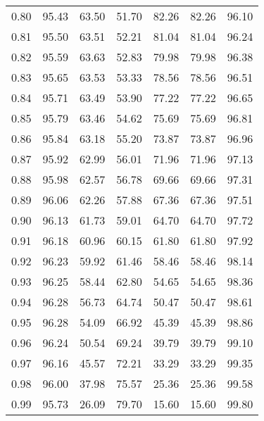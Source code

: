 \begin{tabular}{|c|c|c|c|c|c|c|}
      0.80 &     95.43 &     63.50 &      51.70 &   82.26 &      82.26 &         96.10 \\
      0.81 &     95.50 &     63.51 &      52.21 &   81.04 &      81.04 &         96.24 \\
      0.82 &     95.59 &     63.63 &      52.83 &   79.98 &      79.98 &         96.38 \\
      0.83 &     95.65 &     63.53 &      53.33 &   78.56 &      78.56 &         96.51 \\
      0.84 &     95.71 &     63.49 &      53.90 &   77.22 &      77.22 &         96.65 \\
      0.85 &     95.79 &     63.46 &      54.62 &   75.69 &      75.69 &         96.81 \\
      0.86 &     95.84 &     63.18 &      55.20 &   73.87 &      73.87 &         96.96 \\
      0.87 &     95.92 &     62.99 &      56.01 &   71.96 &      71.96 &         97.13 \\
      0.88 &     95.98 &     62.57 &      56.78 &   69.66 &      69.66 &         97.31 \\
      0.89 &     96.06 &     62.26 &      57.88 &   67.36 &      67.36 &         97.51 \\
      0.90 &     96.13 &     61.73 &      59.01 &   64.70 &      64.70 &         97.72 \\
      0.91 &     96.18 &     60.96 &      60.15 &   61.80 &      61.80 &         97.92 \\
      0.92 &     96.23 &     59.92 &      61.46 &   58.46 &      58.46 &         98.14 \\
      0.93 &     96.25 &     58.44 &      62.80 &   54.65 &      54.65 &         98.36 \\
      0.94 &     96.28 &     56.73 &      64.74 &   50.47 &      50.47 &         98.61 \\
      0.95 &     96.28 &     54.09 &      66.92 &   45.39 &      45.39 &         98.86 \\
      0.96 &     96.24 &     50.54 &      69.24 &   39.79 &      39.79 &         99.10 \\
      0.97 &     96.16 &     45.57 &      72.21 &   33.29 &      33.29 &         99.35 \\
      0.98 &     96.00 &     37.98 &      75.57 &   25.36 &      25.36 &         99.58 \\
      0.99 &     95.73 &     26.09 &      79.70 &   15.60 &      15.60 &         99.80 \\
\bottomrule
\end{tabular}
